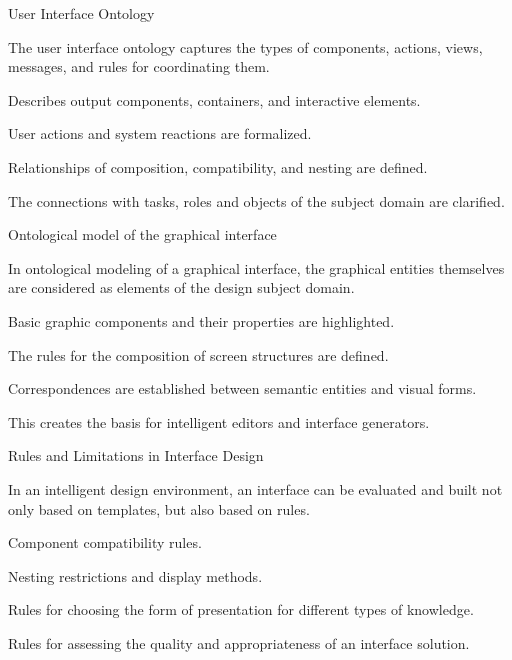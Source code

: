 \begin{frame}{User Interface Ontology}
	\topline
	\justifying
	
	The user interface ontology captures the types of components, actions, views, messages, and rules for coordinating them.
	
	\begin{textitemize}
		\item Describes output components, containers, and interactive elements.
		\item User actions and system reactions are formalized.
		\item Relationships of composition, compatibility, and nesting are defined.
		\item The connections with tasks, roles and objects of the subject domain are clarified.
	\end{textitemize}
\end{frame}

\begin{frame}{Ontological model of the graphical interface}
	\topline
	\justifying
	
	In ontological modeling of a graphical interface, the graphical entities themselves are considered as elements of the design subject domain.
	
	\begin{textitemize}
		\item Basic graphic components and their properties are highlighted.
		\item The rules for the composition of screen structures are defined.
		\item Correspondences are established between semantic entities and visual forms.
		\item This creates the basis for intelligent editors and interface generators.
	\end{textitemize}
\end{frame}

\begin{frame}{Rules and Limitations in Interface Design}
	\topline
	\justifying
	
	In an intelligent design environment, an interface can be evaluated and built not only based on templates, but also based on rules.
	
	\begin{textitemize}
		\item Component compatibility rules.
		\item Nesting restrictions and display methods.
		\item Rules for choosing the form of presentation for different types of knowledge.
		\item Rules for assessing the quality and appropriateness of an interface solution.
	\end{textitemize}
\end{frame}

